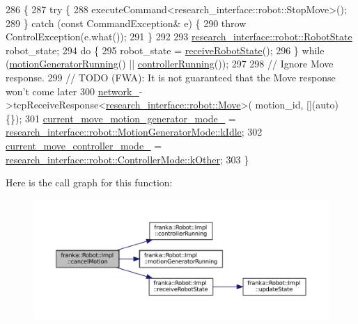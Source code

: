 \begin{DoxyCode}
286                                                \{
287   \textcolor{keywordflow}{try} \{
288     executeCommand<research\_interface::robot::StopMove>();
289   \} \textcolor{keywordflow}{catch} (\textcolor{keyword}{const} CommandException& e) \{
290     \textcolor{keywordflow}{throw} ControlException(e.what());
291   \}
292 
293   \hyperlink{structresearch__interface_1_1robot_1_1RobotState}{research\_interface::robot::RobotState} robot\_state;
294   \textcolor{keywordflow}{do} \{
295     robot\_state = \hyperlink{classfranka_1_1Robot_1_1Impl_a15161988fd2644aa2757e196e4488b38}{receiveRobotState}();
296   \} \textcolor{keywordflow}{while} (\hyperlink{classfranka_1_1Robot_1_1Impl_aa6b34693c27b529a52f7ea5a607c7252}{motionGeneratorRunning}() || \hyperlink{classfranka_1_1Robot_1_1Impl_ac2d91fb2b9838536bcea8ab1aae4802e}{controllerRunning}());
297 
298   \textcolor{comment}{// Ignore Move response.}
299   \textcolor{comment}{// TODO (FWA): It is not guaranteed that the Move response won't come later}
300   \hyperlink{classfranka_1_1Robot_1_1Impl_acecf3b158ccd1c2ed7e76971f1e6a192}{network\_}->tcpReceiveResponse<\hyperlink{structresearch__interface_1_1robot_1_1Move}{research\_interface::robot::Move}>(
      motion\_id, [](\textcolor{keyword}{auto}) \{\});
301   \hyperlink{classfranka_1_1Robot_1_1Impl_a2fecb29212c55738e284b2ba8249ad5c}{current\_move\_motion\_generator\_mode\_} = 
      \hyperlink{namespaceresearch__interface_1_1robot_abd2451eb963a1843f1eb066ebd4b06e8af5137a026a4b2f3b1c8a21cfc60dd14b}{research\_interface::robot::MotionGeneratorMode::kIdle};
302   \hyperlink{classfranka_1_1Robot_1_1Impl_ab5d1a7e855dae2453635da08440c375e}{current\_move\_controller\_mode\_} = 
      \hyperlink{namespaceresearch__interface_1_1robot_a54ee0c8bfefd2ee8a46837ca6d2b1213a341b8a8f03cf33821c46aa5c3aad4b7a}{research\_interface::robot::ControllerMode::kOther};
303 \}
\end{DoxyCode}
Here is the call graph for this function\+:
\nopagebreak
\begin{figure}[H]
\begin{center}
\leavevmode
\includegraphics[width=350pt]{classfranka_1_1Robot_1_1Impl_a30a3ca95296656edb350c49808c74385_cgraph}
\end{center}
\end{figure}
\mbox{\label{classfranka_1_1Robot_1_1Impl_ac2d91fb2b9838536bcea8ab1aae4802e}} 
